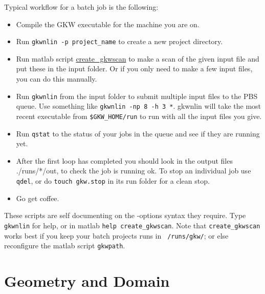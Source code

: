 \documentclass[a4paper,10pt]{article}
\newcommand{\matlab}[1]{\href{http://bitbucket.org/gkw/gkw/src/HEAD/matlab/#1}{#1}}
\begin{document}
Typical workflow for a batch job is the following:
\begin{itemize}
\item Compile the GKW executable for the machine you are on. 
\item Run \texttt{gkwnlin -p project\_name} to create a new project directory.
\item Run matlab script \matlab{create\_gkwscan} to make a scan of the given input file and put these in the input folder.  Or if you only need to make a few input files, you can do this manually.
\item Run \texttt{gkwnlin} from the input folder to submit multiple input files to the PBS queue.  Use something like \texttt{gkwnlin -np 8 -h 3 *}.  gkwnlin will take the most recent executable from \texttt{\$GKW\_HOME/run} to run with all the input files you give. 
\item Run \texttt{qstat} to the status of your jobs in the queue and see if they are running yet.
\item After the first loop has completed you should look in the output files ./runs/*/out, to check the job is running ok.
To stop an individual job use \texttt{qdel}, or do \texttt{touch gkw.stop} in its run folder for a clean stop.
\item Go get coffee.

\end{itemize}

These scripts are self documenting on the -options syntax they require.  Type \texttt{gkwnlin} for help, or in matlab \texttt{help create\_gkwscan}.  Note that \texttt{create\_gkwscan} works best if you keep your batch projects runs in \texttt{~/runs/gkw/}; or else reconfigure the matlab script \texttt{gkwpath}.

\section{Geometry and Domain}
\end{document}
